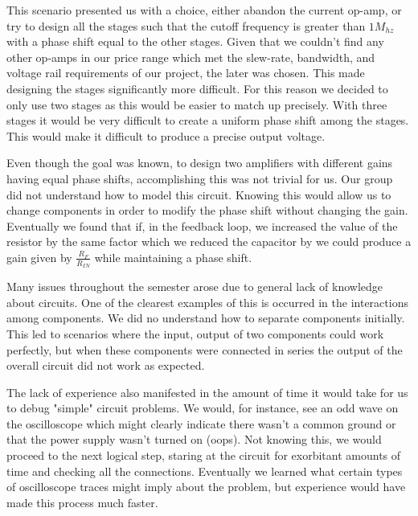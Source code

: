 \documentclass{article}	%
\begin{document}
\begin{multicols}{2}
This scenario presented us with a choice,
either abandon the current op-amp, or
try to design all the stages such that 
the cutoff frequency is greater than $1M_{hz}$
with a phase shift equal to the other stages.
Given that we couldn't find any other op-amps 
in our price range which met the slew-rate, bandwidth,
and voltage rail requirements of our project,
the later was chosen.
This made designing the stages significantly more difficult.
For this reason we decided to only use two stages as
this would be easier to match up precisely.
With three stages it would be very difficult to 
create a uniform phase shift among the stages.
This would make it difficult to produce a precise output voltage.

Even though the goal was known,
to design two amplifiers with different gains 
having equal phase shifts,
accomplishing this was not trivial for us.
Our group did not understand how to model this circuit.
Knowing this would allow us to change components in
order to modify the phase shift without changing the gain.
Eventually we found that if, in the feedback loop,
we increased the value of the resistor by the same
factor which we reduced the capacitor by we could
produce a gain given by $\frac{R_F}{R_{IN}}$
while maintaining a phase shift.

Many issues throughout the semester arose 
due to general lack of knowledge about circuits.
One of the clearest examples of this is occurred
in the interactions among components.
We did no understand how to separate
components initially.
This led to scenarios where the input, output of 
two components could work perfectly, but 
when these components were connected in
series the output of the overall
circuit did not work as expected.

The lack of experience also manifested in
the amount of time it would take for 
us to debug "simple" circuit problems.
We would, for instance, see an odd
wave on the oscilloscope which might clearly
indicate there wasn't a common ground or 
that the power supply wasn't turned on (oops).
Not knowing this,
we would proceed to the next logical step,
staring at the circuit for exorbitant amounts of time
and checking all the connections.
Eventually we learned what certain types of
oscilloscope traces might imply about the problem, but
experience would have made this process much faster.

\end{multicols}
\end{document}
